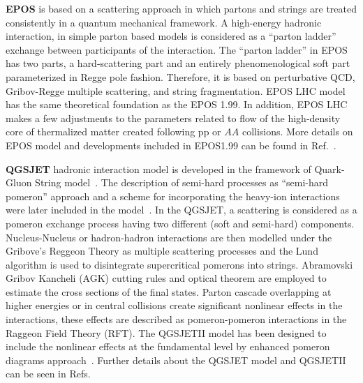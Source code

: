 \documentclass{article}
\begin{document}
{\bf EPOS} is based on a scattering approach in which partons and strings are treated consistently in a quantum mechanical framework. A high-energy hadronic interaction, in simple parton based models is considered as a “parton ladder” exchange between participants of the interaction. The “parton ladder” in EPOS has two parts, a hard-scattering part and an entirely phenomenological soft part parameterized in Regge pole fashion. Therefore, it is based on perturbative QCD, Gribov-Regge multiple scattering, and string fragmentation. EPOS LHC model has the same theoretical foundation as the EPOS 1.99. In addition, EPOS LHC makes a few adjustments to the parameters related to flow of the high-density core of thermalized matter created following pp or $AA$ collisions. %
More details on EPOS model and developments included in EPOS1.99 can be found in Ref.~\cite{Pierog:2009zt}.


{ \bf QGSJET} hadronic interaction model is developed in the framework of Quark-Gluon String model~\cite{Engel:2011zzb}. The description of semi-hard processes as “semi-hard pomeron” approach and a scheme for incorporating the heavy-ion interactions were later included in the model~\cite{Kalmykov:1993qe}. In the QGSJET, a scattering is considered as a pomeron exchange process having two different (soft and semi-hard) components. Nucleus-Nucleus or hadron-hadron interactions are then modelled under the Gribove’s Reggeon Theory as multiple scattering processes and the Lund algorithm is used to disintegrate supercritical pomerons into strings. Abramovski Gribov Kancheli (AGK) cutting rules and optical theorem are employed to estimate the cross sections of the final states. Parton cascade overlapping at higher energies or in central collisions create significant nonlinear effects in the interactions, these effects are described as pomeron-pomeron interactions in the Raggeon Field Theory (RFT). The QGSJETII model has been designed to include the nonlinear effects at the fundamental level by enhanced pomeron diagrams approach~\cite{Ostapchenko:2004ss}. Further details about the QGSJET model and QGSJETII can be seen in Refs.~\cite{Ostapchenko:2004ss, Engel:2011zzb, Kalmykov:1993qe}
\end{document}
